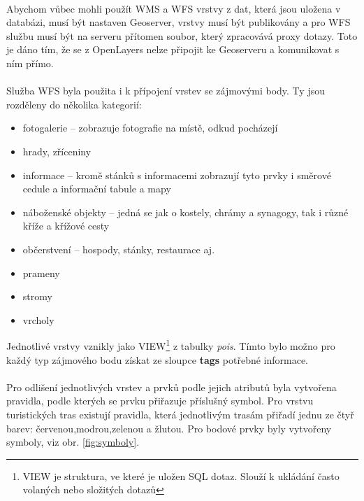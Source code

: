 \documentclass[11pt,a4paper,titlepage,oneside]{book}
\begin{document}
			\paragraph{} Abychom vůbec mohli použít \ac{WMS} a \ac{WFS} vrstvy z dat, která jsou uložena v databázi, musí být nastaven Geoserver, vrstvy musí být publikovány a pro \ac{WFS} službu musí být na serveru přítomen soubor, který zpracovává proxy dotazy. Toto je dáno tím, že se z OpenLayers nelze připojit ke Geoserveru a komunikovat s ním přímo. 

			\paragraph{} Služba \ac{WFS} byla použita i k přípojení vrstev se zájmovými body. Ty jsou rozděleny do několika kategorií:
					\begin{itemize}
						\item fotogalerie -- zobrazuje fotografie na místě, odkud pocházejí
						\item hrady, zříceniny
						\item informace -- kromě stánků s informacemi zobrazují tyto prvky i směrové cedule a informační tabule a mapy
						\item náboženské objekty -- jedná se jak o kostely, chrámy a synagogy, tak i různé kříže a křížové cesty
						\item občerstvení -- hospody, stánky, restaurace aj.
						\item prameny
						\item stromy
						\item vrcholy
					\end{itemize}	
Jednotlivé vrstvy vznikly jako VIEW\footnote{VIEW je struktura, ve které je uložen SQL dotaz. Slouží k ukládání často volaných nebo složitých dotazů} z tabulky \textit{pois}. Tímto bylo možno pro každý typ zájmového bodu získat ze sloupce \textbf{tags} potřebné informace.

			\paragraph{} Pro odlišení jednotlivých vrstev a prvků podle jejich atributů byla vytvořena pravidla, podle kterých se prvku přiřazuje příslušný symbol. Pro vrstvu turistických tras existují pravidla, která jednotlivým trasám přiřadí jednu ze čtyř barev: červenou,modrou,zelenou a žlutou. Pro bodové prvky byly vytvořeny symboly, viz obr. \ref{fig:symboly}.
			
\end{document}
